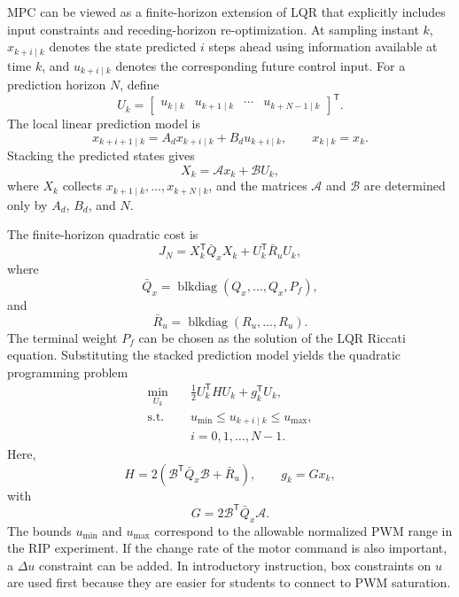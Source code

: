 \documentclass[11pt]{article}
\DeclareMathOperator{\blkdiag}{blkdiag}
\begin{document}
MPC can be viewed as a finite-horizon extension of LQR that explicitly includes input constraints and receding-horizon re-optimization. At sampling instant $k$, $x_{k+i\mid k}$ denotes the state predicted $i$ steps ahead using information available at time $k$, and $u_{k+i\mid k}$ denotes the corresponding future control input. For a prediction horizon $N$, define
\begin{equation}
U_k=
\begin{bmatrix}
 u_{k\mid k} & u_{k+1\mid k} & \cdots & u_{k+N-1\mid k}
\end{bmatrix}^{\mathsf T}.
\label{eq:mpc_U}
\end{equation}
The local linear prediction model is
\begin{equation}
x_{k+i+1\mid k}=A_dx_{k+i\mid k}+B_du_{k+i\mid k},
\qquad x_{k\mid k}=x_k.
\label{eq:mpc_prediction}
\end{equation}
Stacking the predicted states gives
\begin{equation}
X_k=\mathcal{A}x_k+\mathcal{B}U_k,
\label{eq:mpc_stacked}
\end{equation}
where $X_k$ collects $x_{k+1\mid k},\ldots,x_{k+N\mid k}$, and the matrices $\mathcal{A}$ and $\mathcal{B}$ are determined only by $A_d$, $B_d$, and $N$.

The finite-horizon quadratic cost is
\begin{equation}
J_N=X_k^{\mathsf T}\bar{Q}_xX_k+U_k^{\mathsf T}\bar{R}_uU_k,
\label{eq:mpc_cost}
\end{equation}
where
\begin{equation}
\bar{Q}_x=\blkdiag(Q_x,\ldots,Q_x,P_f),
\label{eq:Qbar}
\end{equation}
and
\begin{equation}
\bar{R}_u=\blkdiag(R_u,\ldots,R_u).
\label{eq:Rbar}
\end{equation}
The terminal weight $P_f$ can be chosen as the solution of the LQR Riccati equation. Substituting the stacked prediction model yields the quadratic programming problem
\begin{equation}
\begin{aligned}
\min_{U_k}\quad &\frac{1}{2}U_k^{\mathsf T}HU_k+g_k^{\mathsf T}U_k,\\
\text{s.t.}\quad &u_{\min}\leq u_{k+i\mid k}\leq u_{\max},\\
&i=0,1,\ldots,N-1.
\end{aligned}
\label{eq:mpc_qp}
\end{equation}
Here,
\begin{equation}
H=2\left(\mathcal{B}^{\mathsf T}\bar{Q}_x\mathcal{B}+\bar{R}_u\right),
\qquad g_k=Gx_k,
\label{eq:mpc_H_g}
\end{equation}
with
\begin{equation}
G=2\mathcal{B}^{\mathsf T}\bar{Q}_x\mathcal{A}.
\label{eq:mpc_G}
\end{equation}
The bounds $u_{\min}$ and $u_{\max}$ correspond to the allowable normalized PWM range in the RIP experiment. If the change rate of the motor command is also important, a $\Delta u$ constraint can be added. In introductory instruction, box constraints on $u$ are used first because they are easier for students to connect to PWM saturation.
\end{document}

